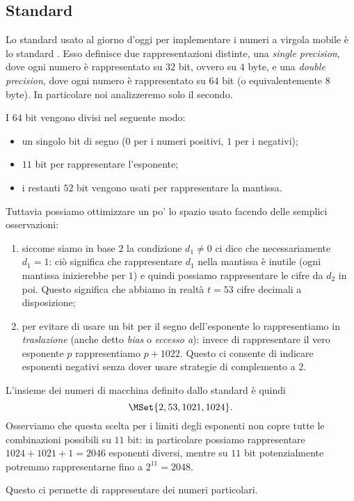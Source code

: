 \subsection{Standard \IEEE}

Lo standard usato al giorno d'oggi per implementare i numeri a virgola mobile è lo standard \IEEE. 
Esso definisce due rappresentazioni distinte, una \emph{single precision}, dove ogni numero è rappresentato su $32$ bit, ovvero su $4$ byte, e una \emph{double precision}, dove ogni numero è rappresentato su $64$ bit (o equivalentemente $8$ byte). 
In particolare noi analizzeremo solo il secondo.

I $64$ bit vengono divisi nel seguente modo:
\begin{itemize}
    \item un singolo bit di segno ($0$ per i numeri positivi, $1$ per i negativi);
    \item $11$ bit per rappresentare l'esponente;
    \item i restanti $52$ bit vengono usati per rappresentare la mantissa.
\end{itemize} Tuttavia possiamo ottimizzare un po' lo spazio usato facendo delle semplici osservazioni:
\begin{enumerate}
    \item siccome siamo in base $2$ la condizione $d_1 \neq 0$ ci dice che necessariamente $d_1 = 1$: ciò significa che rappresentare $d_1$ nella mantissa è inutile (ogni mantissa inizierebbe per $1$) e quindi possiamo rappresentare le cifre da $d_2$ in poi. Questo significa che abbiamo in realtà $t = 53$ cifre decimali a disposizione;
    \item per evitare di usare un bit per il segno dell'esponente lo rappresentiamo in \emph{traslazione} (anche detto \emph{bias} o \emph{eccesso a}): invece di rappresentare il vero esponente $p$ rappresentiamo $p+1022$. Questo ci consente di indicare esponenti negativi senza dover usare strategie di complemento a $2$.  
\end{enumerate}

L'insieme dei numeri di macchina definito dallo standard \IEEE è quindi \[
    \MSet{2, 53, 1021, 1024}.
\] 
Osserviamo che questa scelta per i limiti degli esponenti non copre tutte le combinazioni possibili su $11$ bit: in particolare possiamo rappresentare $1024 + 1021 + 1 = 2046$ esponenti diversi, mentre su $11$ bit potenzialmente potremmo rappresentarne fino a $2^{11} = 2048$.

Questo ci permette di rappresentare dei numeri particolari.

